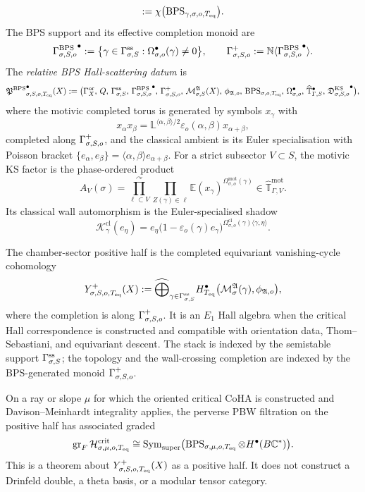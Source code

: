 \begin{definition}
\[ :=
 \chi\bigl(\operatorname{BPS}_{\gamma,\sigma,o,T_{\mathrm{eq}}}\bigr).
\]
The BPS support and its effective completion monoid are
\[
 {\Gamma^{\mathrm{BPS}}_{\sigma,S,o}}^{\bullet}
 :=
 \bigl\{\gamma\in\Gamma^{\mathrm{ss}}_{\sigma,S}:
 \Omega^{\bullet}_{\sigma,o}(\gamma)\neq0\bigr\},
 \qquad
 \Gamma^{+}_{\sigma,S,o}
 :=
 \mathbb N\langle{\Gamma^{\mathrm{BPS}}_{\sigma,S,o}}^{\bullet}\rangle.
\]
The \emph{relative BPS Hall-scattering datum} is
\[
 {\mathfrak{P}^{\mathrm{BPS}}}^{\bullet}_{\sigma,S,o,T_{\mathrm{eq}}}(X)
 :=
 \bigl(
 \Gamma_X^{\mathrm{or}},\,
 Q,\,
 \Gamma^{\mathrm{ss}}_{\sigma,S},\,
 {\Gamma^{\mathrm{BPS}}_{\sigma,S,o}}^{\bullet},\,
 \Gamma^{+}_{\sigma,S,o},\,
 \mathcal{M}^{\mathfrak A}_{\sigma,S}(X),\,
 \phi_{\mathfrak A,o},\,
 \operatorname{BPS}_{\sigma,o,T_{\mathrm{eq}}},\,
 \Omega^{\bullet}_{\sigma,o},\,
 \widehat{\mathbb T}^{\bullet}_{\Gamma,S},\,
 {\mathfrak{D}^{\mathrm{KS}}_{\sigma,S,o}}^{\bullet}
 \bigr),
\]
where the motivic completed torus is generated by symbols $x_\gamma$
with
\[
 x_\alpha x_\beta
 =
 \mathbb L^{\langle\alpha,\beta\rangle/2}
 \varepsilon_o(\alpha,\beta)x_{\alpha+\beta},
\]
completed along $\Gamma^{+}_{\sigma,S,o}$, and the classical ambient is its Euler
specialisation with Poisson bracket
$\{e_\alpha,e_\beta\}=\langle\alpha,\beta\rangle e_{\alpha+\beta}$.
For a strict subsector $V\subset S$, the motivic KS factor is the
phase-ordered product
\[
 A_V(\sigma)
 =
 \prod_{\ell\subset V}^{\curvearrowright}
 \prod_{Z(\gamma)\in\ell}
 \mathbb E(x_\gamma)^{\Omega^{\mathrm{mot}}_{\sigma,o}(\gamma)}
 \in\widehat{\mathbb T}^{\mathrm{mot}}_{\Gamma,V}.
\]
Its classical wall automorphism is the Euler-specialised shadow
\[
 \mathcal K^{\mathrm{cl}}_\gamma(e_\eta)
 =
 e_\eta
 \bigl(1-\varepsilon_o(\gamma)e_\gamma\bigr)^{
 \Omega^{\mathrm{cl}}_{\sigma,o}(\gamma)\langle\gamma,\eta\rangle}.
\]
\end{definition}

\begin{definition}
\label{def:positive-half-effective-bps}
The chamber-sector positive half is the completed equivariant
vanishing-cycle cohomology
\[
 Y^+_{\sigma,S,o,T_{\mathrm{eq}}}(X)
 :=
 \widehat{\bigoplus}_{\gamma\in\Gamma^{\mathrm{ss}}_{\sigma,S}}
 H^\bullet_{T_{\mathrm{eq}}}
 \bigl(\mathcal M^{\mathfrak A}_\sigma(\gamma),
 \phi_{\mathfrak A,o}\bigr),
\]
where the completion is along $\Gamma^{+}_{\sigma,S,o}$. It is an $E_1$ Hall algebra
when the critical Hall correspondence is constructed and compatible with
orientation data, Thom--Sebastiani, and equivariant descent. The stack
is indexed by the semistable support $\Gamma^{\mathrm{ss}}_{\sigma,S}$; the topology and the
wall-crossing completion are indexed by the BPS-generated monoid
$\Gamma^{+}_{\sigma,S,o}$.
\end{definition}

\begin{theorem}
\label{thm:effective-bps-pbw-shadow}
On a ray or slope $\mu$ for which the oriented critical CoHA is
constructed and Davison--Meinhardt integrality applies, the perverse
PBW filtration on the positive half has associated graded
\[
 \operatorname{gr}_F
 \mathcal H^{\mathrm{crit}}_{\sigma,\mu,o,T_{\mathrm{eq}}}
 \cong
 \operatorname{Sym}_{\mathrm{super}}
 \bigl(
 \operatorname{BPS}_{\sigma,\mu,o,T_{\mathrm{eq}}}
 \otimes H^\bullet(B\mathbb C^*)
 \bigr).
\]
This is a theorem about $Y^+_{\sigma,S,o,T_{\mathrm{eq}}}(X)$ as a positive half.
It does not construct a Drinfeld double, a theta basis, or a modular
tensor category.
\end{theorem}

